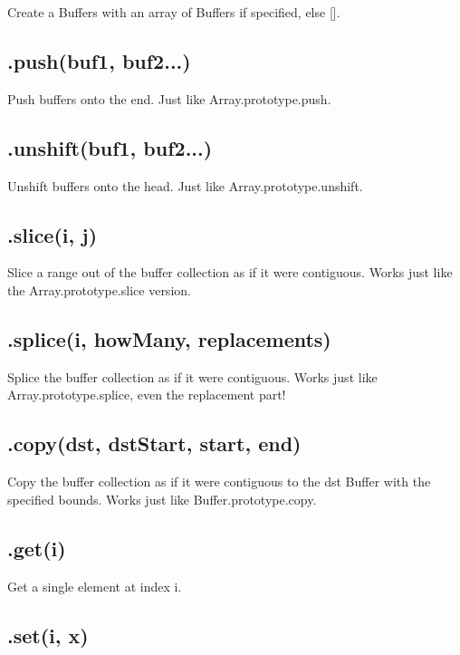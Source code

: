 Create a Buffers with an array of {\ttfamily Buffer}s if specified, else {\ttfamily \mbox{[}\mbox{]}}.

\subsection*{.push(buf1, buf2...) }

Push buffers onto the end. Just like {\ttfamily Array.\+prototype.\+push}.

\subsection*{.unshift(buf1, buf2...) }

Unshift buffers onto the head. Just like {\ttfamily Array.\+prototype.\+unshift}.

\subsection*{.slice(i, j) }

Slice a range out of the buffer collection as if it were contiguous. Works just like the {\ttfamily Array.\+prototype.\+slice} version.

\subsection*{.splice(i, how\+Many, replacements) }

Splice the buffer collection as if it were contiguous. Works just like {\ttfamily Array.\+prototype.\+splice}, even the replacement part!

\subsection*{.copy(dst, dst\+Start, start, end) }

Copy the buffer collection as if it were contiguous to the {\ttfamily dst} Buffer with the specified bounds. Works just like {\ttfamily Buffer.\+prototype.\+copy}.

\subsection*{.get(i) }

Get a single element at index {\ttfamily i}.

\subsection*{.set(i, x) }

